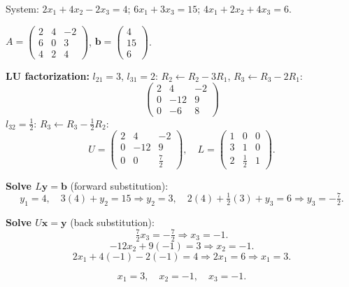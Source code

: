\documentclass[12pt,a3paper]{article}
\begin{document}
\begin{tcolorbox}[enhanced,breakable,
  colback=cB!4,colframe=cB,boxrule=0.8pt,arc=5pt,
  title={\textbf{Answer --- Solve System via LU Factorization}},
  fonttitle=\bfseries\color{white},colbacktitle=cB]

System: $2x_1+4x_2-2x_3=4$;\; $6x_1+3x_3=15$;\; $4x_1+2x_2+4x_3=6$.

$A=\begin{pmatrix}2&4&-2\\6&0&3\\4&2&4\end{pmatrix}$, $\mathbf{b}=\begin{pmatrix}4\\15\\6\end{pmatrix}$.

\textbf{LU factorization:}
$l_{21}=3$, $l_{31}=2$: $R_2\leftarrow R_2-3R_1$, $R_3\leftarrow R_3-2R_1$:
\[
\begin{pmatrix}2&4&-2\\0&-12&9\\0&-6&8\end{pmatrix}
\]
$l_{32}=\frac{1}{2}$: $R_3\leftarrow R_3-\frac{1}{2}R_2$:
\[
U=\begin{pmatrix}2&4&-2\\0&-12&9\\0&0&\frac{7}{2}\end{pmatrix},\quad
L=\begin{pmatrix}1&0&0\\3&1&0\\2&\frac{1}{2}&1\end{pmatrix}.
\]

\textbf{Solve $L\mathbf{y}=\mathbf{b}$} (forward substitution):
\[
y_1=4,\quad 3(4)+y_2=15\Rightarrow y_2=3,\quad 2(4)+\tfrac{1}{2}(3)+y_3=6\Rightarrow y_3=-\tfrac{7}{2}.
\]

\textbf{Solve $U\mathbf{x}=\mathbf{y}$} (back substitution):
\[
\tfrac{7}{2}x_3=-\tfrac{7}{2}\Rightarrow x_3=-1.
\]
\[
-12x_2+9(-1)=3\Rightarrow x_2=-1.
\]
\[
2x_1+4(-1)-2(-1)=4\Rightarrow 2x_1=6\Rightarrow x_1=3.
\]

\[
\boxed{x_1=3,\quad x_2=-1,\quad x_3=-1.}
\]

\end{tcolorbox}
\end{document}
